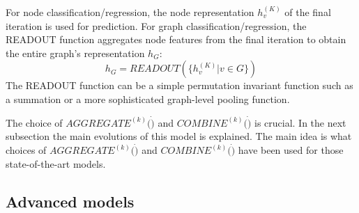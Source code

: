 For node classification/regression, the node representation $h_v^{(K)}$ of the final iteration is used for prediction. For graph classification/regression, the READOUT function aggregates node features from the final iteration to obtain the entire graph's representation $h_G$:
$$h_G = READOUT(\{h_v^{(K)} | v \in G\})$$
The READOUT function can be a simple permutation invariant function such as a summation or a more sophisticated graph-level pooling function.

The choice of $AGGREGATE^{(k)}(\dot)$ and $COMBINE^{(k)}(\dot)$ is crucial. In the next subsection the main evolutions of this model is explained. The main idea is what choices of $AGGREGATE^{(k)}(\dot)$ and $COMBINE^{(k)}(\dot)$  have been used for those state-of-the-art models. 











\subsection{Advanced models} 




